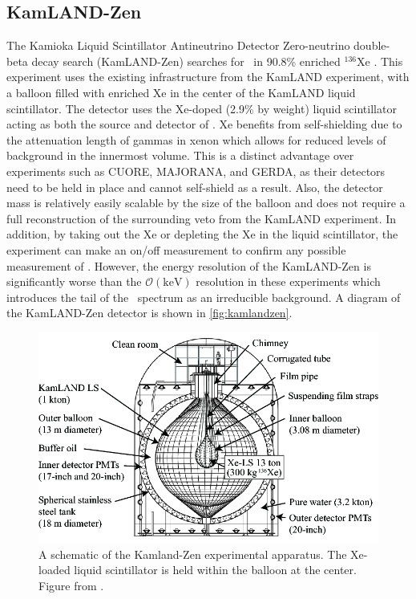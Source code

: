 \subsection{KamLAND-Zen}
The Kamioka Liquid Scintillator Antineutrino Detector Zero-neutrino double-beta decay search (KamLAND-Zen) searches for \zeronubb~in 90.8\% enriched $^{136}$Xe \cite{KamLAND-Zen:2016pfg}.
This experiment uses the existing infrastructure from the KamLAND experiment, with a balloon filled with enriched Xe in the center of the KamLAND liquid scintillator.
The detector uses the Xe-doped (2.9\% by weight) liquid scintillator acting as both the source and detector of \zeronubb.
Xe benefits from self-shielding due to the attenuation length of gammas in xenon which allows for reduced levels of background in the innermost volume.
This is a distinct advantage over experiments such as CUORE, MAJORANA, and GERDA, as their detectors need to be held in place and cannot self-shield as a result.
Also, the detector mass is relatively easily scalable by the size of the balloon and does not require a full reconstruction of the surrounding veto from the KamLAND experiment.
In addition, by taking out the Xe or depleting the Xe in the liquid scintillator, the experiment can make an on/off measurement to confirm any possible measurement of \zeronubb. 
However, the energy resolution of the KamLAND-Zen is significantly worse than the $\mathcal{O}(\textrm{keV})$ resolution in these experiments which introduces the tail of the \twonubb~spectrum as an irreducible background.
A diagram of the KamLAND-Zen detector is shown in \autoref{fig:kamlandzen}.
\begin{figure}[tbph]
\centering
\includegraphics[width=0.7\linewidth]{Figures/KamlandZen}
\caption[A schematic of the Kamland-Zen experimental apparatus.]
{A schematic of the Kamland-Zen experimental apparatus.
The Xe-loaded liquid scintillator is held within the balloon at the center.
Figure from \cite{::2015uaa}.}
\label{fig:kamlandzen}
\end{figure}

